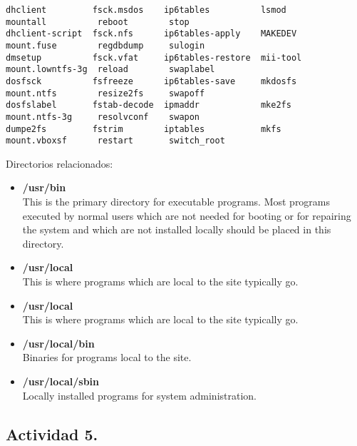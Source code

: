 \documentclass[a4paper,11pt,spanish]{article} %
\newenvironment{mytinylisting}
{\begin{list}{}{\setlength{\leftmargin}{1em}}\item\tiny\bfseries}
{\end{list}}
\begin{document}
\begin{mytinylisting}
\begin{verbatim}
dhclient         fsck.msdos    ip6tables          lsmod             mountall          reboot        stop                     
dhclient-script  fsck.nfs      ip6tables-apply    MAKEDEV           mount.fuse        regdbdump     sulogin                  
dmsetup          fsck.vfat     ip6tables-restore  mii-tool          mount.lowntfs-3g  reload        swaplabel                
dosfsck          fsfreeze      ip6tables-save     mkdosfs           mount.ntfs        resize2fs     swapoff                  
dosfslabel       fstab-decode  ipmaddr            mke2fs            mount.ntfs-3g     resolvconf    swapon
dumpe2fs         fstrim        iptables           mkfs              mount.vboxsf      restart       switch_root
 \end{verbatim}
\end{mytinylisting}

Directorios relacionados:
    
\begin{itemize}
 \item \textbf{/usr/bin}\\   
    This is the primary directory for executable programs. Most
    programs executed by normal users which are not needed for 
    booting or for repairing the system and which are not
    installed locally should be placed in this directory.

\item \textbf{/usr/local}\\
    This is where programs which are local to the site typically
    go.
    
 \item \textbf{/usr/local}\\
    This is where programs which are local to the site typically
    go.
    
 \item \textbf{/usr/local/bin}\\
    Binaries for programs local to the site.
 
  \item \textbf{/usr/local/sbin}\\
    Locally installed programs for system administration.
\end{itemize}

\cite{wikifhs}

\subsection{Actividad 5.}
\end{document}
